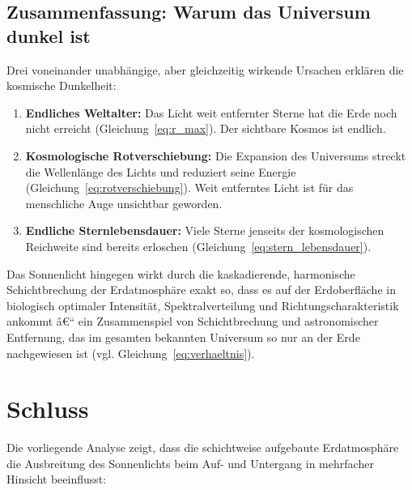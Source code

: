 ﻿\documentclass[12pt,a4paper]{article}
\begin{document}
\subsection{Zusammenfassung: Warum das Universum dunkel ist}

Drei voneinander unabhängige, aber gleichzeitig wirkende
Ursachen erklären die kosmische Dunkelheit:

\begin{enumerate}
  \item \textbf{Endliches Weltalter:}
        Das Licht weit entfernter Sterne hat die Erde noch nicht
        erreicht (Gleichung~\ref{eq:r_max}).
        Der sichtbare Kosmos ist endlich.

  \item \textbf{Kosmologische Rotverschiebung:}
        Die Expansion des Universums streckt die Wellenlänge
        des Lichts und reduziert seine Energie
        (Gleichung~\ref{eq:rotverschiebung}).
        Weit entferntes Licht ist für das menschliche Auge
        unsichtbar geworden.

  \item \textbf{Endliche Sternlebensdauer:}
        Viele Sterne jenseits der kosmologischen Reichweite
        sind bereits erloschen (Gleichung~\ref{eq:stern_lebensdauer}).
\end{enumerate}

Das Sonnenlicht hingegen wirkt durch die kaskadierende,
harmonische Schichtbrechung der Erdatmosphäre exakt so,
dass es auf der Erdoberfläche in biologisch optimaler Intensität,
Spektralverteilung und Richtungscharakteristik ankommt â€“
ein Zusammenspiel von Schichtbrechung und astronomischer Entfernung,
das im gesamten bekannten Universum so nur an der Erde nachgewiesen ist
(vgl. Gleichung~\ref{eq:verhaeltnis}).

\section{Schluss}
\label{sec:schluss}

Die vorliegende Analyse zeigt, dass die schichtweise aufgebaute
Erdatmosphäre die Ausbreitung des Sonnenlichts beim Auf- und
Untergang in mehrfacher Hinsicht beeinflusst:
\end{document}
